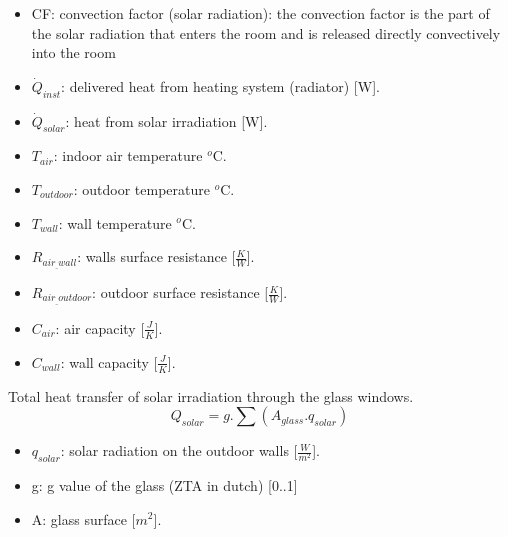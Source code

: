  \begin{itemize}
      \item CF: convection factor (solar radiation): the convection factor is the part of the solar radiation that enters the room and is released directly convectively into the room
      \item $\dot{Q}_{inst}$: delivered heat from heating system (radiator) [W].
      \item $\dot{Q}_{solar}$: heat from solar irradiation [W].
      \item $T_{air}$: indoor air temperature $^o$C.
      \item $T_{outdoor}$: outdoor temperature $^o$C.
      \item $T_{wall}$: wall temperature $^o$C.
      \item $R_{air_{\_}wall}$: walls surface resistance [$\frac{K}{W}$].
      \item $R_{air_{\_}outdoor}$: outdoor surface resistance [$\frac{K}{W}$].
      \item $C_{air}$: air capacity [$\frac{J}{K}$].
      \item $C_{wall}$: wall capacity [$\frac{J}{K}$].
    \end{itemize}

\newpage   

Total heat transfer of solar irradiation through the glass windows. 
\begin{equation}
Q_{solar}=g.\sum(A_{glass}.q_{solar})
\end{equation}

\begin{itemize}
    \item $q_{solar}$: solar radiation on the outdoor walls [$\frac{W}{m^2}$]. 
    \item g: g value of the glass (ZTA in dutch) [0..1]\cite{zontoetreding}
    \item A: glass surface [$m^2$].
\end{itemize}



\newpage
